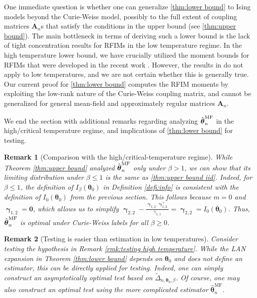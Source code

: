 \documentclass[preprint,reqno]{imsart}
\newtheorem{remark}{Remark}[section]
\newcommand{\ttheta}{\boldsymbol{\theta}}
\DeclareMathOperator{\ggamma}{\boldsymbol{\gamma}}
\newcommand{\A}{\mathbf{A}}
\newcommand{\thetamf}{\hat{\boldsymbol \theta}^{\text{MF}}_{\mathnormal n}}
\begin{document}
One immediate question is whether one can generalize \cref{thm:lower bound} to Ising models beyond the Curie-Weiss model, possibly to the full extent of coupling matrices $\A_n$s that satisfy the conditions in the upper bound (see \cref{thm:upper bound}).
%
    The main bottleneck in terms of deriving such a lower bound is the lack of tight concentration results for RFIMs in the low temperature regime. In the high temperature lower bound, we have crucially utilized the moment bounds for RFIMs that were developed in the recent work \cite{lee2024rfim}. However, the results in \cite{lee2024rfim} do not apply to low temperatures, and we are not certain whether this is generally true. Our current proof for \cref{thm:lower bound} computes the RFIM moments by exploiting the low-rank nature of the Curie-Weiss coupling matrix, and cannot be generalized for general mean-field and approximately regular matrices $\A_n$.
%

We end the section with additional remarks regarding analyzing $\thetamf$ in the high/critical temperature regime, and implications of \cref{thm:lower bound} for testing.
%

\begin{remark}[Comparison with the high/critical-temperature regime]
    While Theorem \ref{thm:upper bound} analyzed $\thetamf$ only under $\beta > 1$, we can show that its limiting distribution under $\beta \le 1$ is the same as \cref{thm:upper bound iid}. Indeed, for $\beta \le 1$, the definition of $I_{\beta}(\ttheta_0)$ in Definition \ref{defi:info} is consistent with the definition of $I_0(\ttheta_0)$ from the previous section. This follows because $m = 0$ and $\ggamma_{1,2} = \mathbf{0}$, which allows us to simplify $\ggamma_{2,2} - \frac{\ggamma_{1,2} \ggamma_{1,2}^\top}{\gamma_{1,1}} = \ggamma_{2,2} = I_0(\ttheta_0)$. Thus, $\thetamf$ is optimal under Curie-Weiss labels for \emph{all} $\beta \ge 0$.
\end{remark}

\begin{remark}[Testing is easier than estimation in low temperatures]
    Consider testing the hypothesis in Remark \ref{rmk:testing high temperature}. While the LAN expansion in Theorem \ref{thm:lower bound} depends on $\ttheta_0$ and does not define an estimator, this can be directly applied for testing. Indeed, one can simply construct an asymptotically optimal test based on $\tilde{\Delta}_{n, \ttheta_0, \beta}$. Of course, one may also construct an optimal test using the more complicated estimator $\hat{\ttheta}_n^{\text{MF}}$.
\end{remark}
\end{document}
